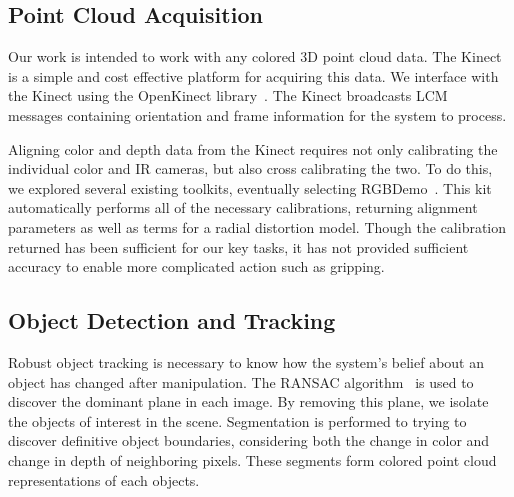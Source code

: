 \documentclass[11pt]{article}
\begin{document}
\subsection{Point Cloud Acquisition}
Our work is intended to work with any colored 3D point cloud data. The
Kinect is a simple and cost effective platform for acquiring
this data. We interface with the Kinect using the OpenKinect
library~\cite{OpenKinect}. The Kinect broadcasts LCM~\cite{huang2010} messages
containing orientation and frame information for the system to process.

Aligning color and depth data from the Kinect requires not only
calibrating the individual color and IR cameras, but also cross calibrating
the two. To do this, we explored several existing toolkits, eventually
selecting RGBDemo~\cite{rgbdemo}. This kit automatically performs all of the
necessary calibrations, returning alignment parameters as well as terms for a
radial distortion model. Though the calibration returned has been sufficient
for our key tasks, it has not provided sufficient accuracy to enable more
complicated action such as gripping.

\subsection{Object Detection and Tracking}
Robust object tracking is necessary to know how the system's belief about an
object has changed after manipulation.
The RANSAC algorithm~\cite{fischler1981random} is used to discover the dominant
plane in each image. By removing this plane, we isolate the objects of
interest in the scene. Segmentation is performed to trying to discover
definitive object boundaries, considering both the change in
color and change in depth of neighboring pixels. These segments form colored
point cloud representations of each objects.
\end{document}
